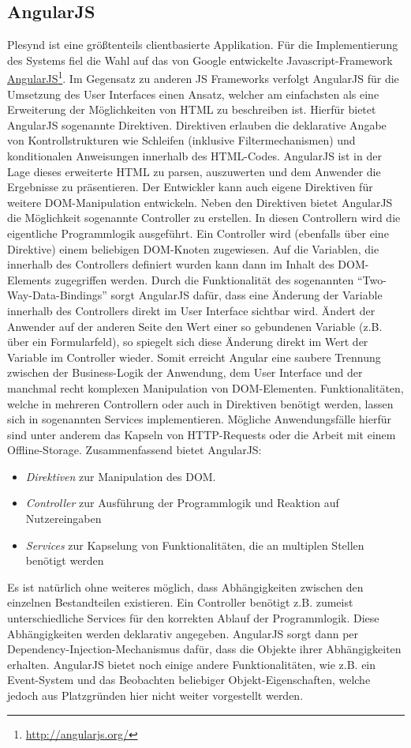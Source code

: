 \subsection{AngularJS}\label{section:angularjs}
Plesynd ist eine größtenteils clientbasierte Applikation. Für die Implementierung des Systems fiel die Wahl auf das von Google entwickelte Javascript-Framework \href{http://angularjs.org/}{AngularJS}\footnote{\url{http://angularjs.org/}}. Im Gegensatz zu anderen JS Frameworks verfolgt AngularJS für die Umsetzung des User Interfaces einen Ansatz, welcher am einfachsten als eine Erweiterung der Möglichkeiten von HTML zu beschreiben ist. Hierfür bietet AngularJS sogenannte Direktiven. Direktiven erlauben die deklarative Angabe von Kontrollstrukturen wie Schleifen (inklusive Filtermechanismen) und konditionalen Anweisungen innerhalb des HTML-Codes. AngularJS ist in der Lage dieses erweiterte HTML zu parsen, auszuwerten und dem Anwender die Ergebnisse zu präsentieren. Der Entwickler kann auch eigene Direktiven für weitere DOM-Manipulation entwickeln. Neben den Direktiven bietet AngularJS die Möglichkeit sogenannte Controller zu erstellen. In diesen Controllern wird die eigentliche Programmlogik ausgeführt. Ein Controller wird (ebenfalls über eine Direktive) einem beliebigen DOM-Knoten zugewiesen. Auf die Variablen, die innerhalb des Controllers definiert wurden kann dann im Inhalt des DOM-Elements zugegriffen werden. Durch die Funktionalität des sogenannten "`Two-Way-Data-Bindings"' sorgt AngularJS dafür, dass eine Änderung der Variable innerhalb des Controllers direkt im User Interface sichtbar wird. Ändert der Anwender auf der anderen Seite den Wert einer so gebundenen Variable (z.B. über ein Formularfeld), so spiegelt sich diese Änderung direkt im Wert der Variable im Controller wieder. Somit erreicht Angular eine saubere Trennung zwischen der Business-Logik der Anwendung, dem User Interface und der manchmal recht komplexen Manipulation von DOM-Elementen. Funktionalitäten, welche in mehreren Controllern oder auch in Direktiven benötigt werden, lassen sich in sogenannten Services implementieren. Mögliche Anwendungsfälle hierfür sind unter anderem das Kapseln von HTTP-Requests oder die Arbeit mit einem Offline-Storage. Zusammenfassend bietet AngularJS:
\begin{itemize}
 \item \emph{Direktiven} zur Manipulation des DOM.
 \item \emph{Controller} zur Ausführung der Programmlogik und Reaktion auf Nutzereingaben
 \item \emph{Services} zur Kapselung von Funktionalitäten, die an multiplen Stellen benötigt werden
\end{itemize}
Es ist natürlich ohne weiteres möglich, dass Abhängigkeiten zwischen den einzelnen Bestandteilen existieren. Ein Controller benötigt z.B. zumeist unterschiedliche Services für den korrekten Ablauf der Programmlogik. Diese Abhängigkeiten werden deklarativ angegeben. AngularJS sorgt dann per Dependency-Injection-Mechanismus dafür, dass die Objekte ihrer Abhängigkeiten erhalten. AngularJS bietet noch einige andere Funktionalitäten, wie z.B. ein Event-System und das Beobachten beliebiger Objekt-Eigenschaften, welche jedoch aus Platzgründen hier nicht weiter vorgestellt werden.

